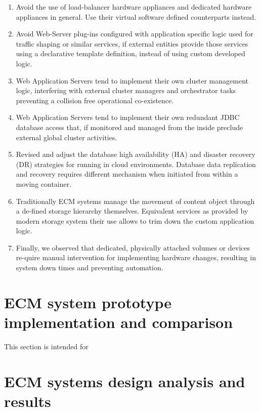 \documentclass[EPiC]{easychair} %
\begin{document}
\begin{enumerate}
    \item Avoid the use of load-balancer hardware appliances and dedicated hardware appliances in general. Use their virtual software defined counterparts instead.
    \item Avoid Web-Server plug-ins configured with application specific logic used for traffic shaping or similar services, if external entities provide those services using a declarative template definition, instead of using custom developed logic.
    \item Web Application Servers tend to implement their own cluster management logic, interfering with external cluster managers and orchestrator tasks preventing a collision free operational co-existence.  
    \item Web Application Servers tend to implement their own redundant JDBC database access that, if monitored and managed from the inside preclude external global cluster activities.    
    \item Revised and adjust the database high availability (HA) and disaster recovery (DR) strategies for running in cloud environments. Database data replication and recovery requires different mechanism when initiated from within a moving container.
    \item Traditionally ECM systems manage the movement of content object through a de-fined storage hierarchy themselves. Equivalent services as provided by modern storage system their use allows to trim down the custom application logic.        
    \item  Finally, we observed that dedicated, physically attached volumes or devices re-quire manual intervention for implementing hardware changes, resulting in system down times and preventing automation.
\end{enumerate}

\section{ECM system prototype implementation and comparison}

This section is intended for 

\section{ECM systems design analysis and results}
\label{sect:analysis-results}
\end{document}
